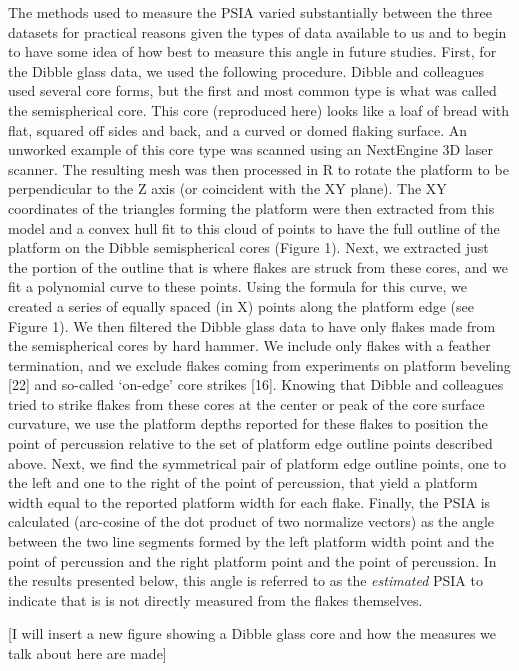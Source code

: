 \documentclass[10pt,letterpaper]{article}
\begin{document}
The methods used to measure the PSIA varied substantially between the
three datasets for practical reasons given the types of data available
to us and to begin to have some idea of how best to measure this angle
in future studies. First, for the Dibble glass data, we used the
following procedure. Dibble and colleagues used several core forms, but
the first and most common type is what was called the semispherical
core. This core (reproduced here) looks like a loaf of bread with flat,
squared off sides and back, and a curved or domed flaking surface. An
unworked example of this core type was scanned using an NextEngine 3D
laser scanner. The resulting mesh was then processed in R to rotate the
platform to be perpendicular to the Z axis (or coincident with the XY
plane). The XY coordinates of the triangles forming the platform were
then extracted from this model and a convex hull fit to this cloud of
points to have the full outline of the platform on the Dibble
semispherical cores (Figure 1). Next, we extracted just the portion of
the outline that is where flakes are struck from these cores, and we fit
a polynomial curve to these points. Using the formula for this curve, we
created a series of equally spaced (in X) points along the platform edge
(see Figure 1). We then filtered the Dibble glass data to have only
flakes made from the semispherical cores by hard hammer. We include only
flakes with a feather termination, and we exclude flakes coming from
experiments on platform beveling {[}22{]} and so-called `on-edge' core
strikes {[}16{]}. Knowing that Dibble and colleagues tried to strike
flakes from these cores at the center or peak of the core surface
curvature, we use the platform depths reported for these flakes to
position the point of percussion relative to the set of platform edge
outline points described above. Next, we find the symmetrical pair of
platform edge outline points, one to the left and one to the right of
the point of percussion, that yield a platform width equal to the
reported platform width for each flake. Finally, the PSIA is calculated
(arc-cosine of the dot product of two normalize vectors) as the angle
between the two line segments formed by the left platform width point
and the point of percussion and the right platform point and the point
of percussion. In the results presented below, this angle is referred to
as the \emph{estimated} PSIA to indicate that is is not directly
measured from the flakes themselves.

{[}I will insert a new figure showing a Dibble glass core and how the
measures we talk about here are made{]}
\end{document}
